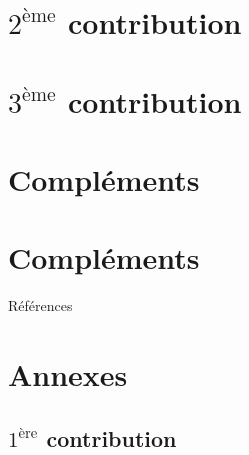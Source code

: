 \documentclass[10pt,aspectratio=169]{beamer}
\begin{document}
\section{$2^{\text{ème}}$ contribution}
  
  
  
  
  
  
\section{$3^{\text{ème}}$ contribution}
  
  
  
  
  
  
  
\section{Compléments}
% 


\section*{Compléments}

\begin{frame}[allowframebreaks]{Références}
  \tiny %
  
\end{frame}

\section{Annexes}

\subsection*{$1^{\text{ère}}$ contribution}
  
  
  
  
    
    
    
    
  
  
  
\end{document}
